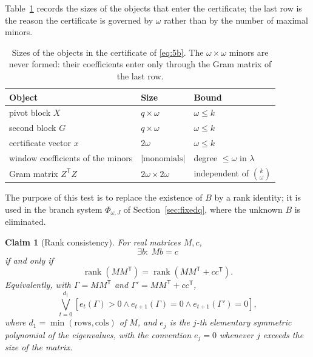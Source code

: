 \documentclass[journal]{IEEEtran}
\theoremstyle{plainn}
\newtheorem{claim}{Claim}
\theoremstyle{remark}
\begin{document}
Table~\ref{tab:certdim} records the sizes of the objects that enter the certificate; the last row is
the reason the certificate is governed by $\omega$ rather than by the number of maximal minors.

\begin{table}[!t]
\centering
\caption{Sizes of the objects in the certificate of \eqref{eq:5b}. The $\omega\times\omega$ minors are
never formed: their coefficients enter only through the Gram matrix of the last row.}
\label{tab:certdim}
\footnotesize
\begin{tabular}{@{}lll@{}}
\toprule
Object & Size & Bound \\
\midrule
pivot block $X$ & $q\times\omega$ & $\omega\le k$ \\
second block $G$ & $q\times\omega$ & $\omega\le k$ \\
certificate vector $x$ & $2\omega$ & $\omega\le k$ \\
window coefficients of the minors & $|\text{monomials}|$ & degree $\le\omega$ in $\lambda$ \\
Gram matrix $Z^{\mathsf T}Z$ & $2\omega\times2\omega$ & independent of $\binom{k}{\omega}$ \\
\bottomrule
\end{tabular}
\end{table}

The purpose of this test is to replace the existence of $B$ by a rank identity; it is used in the branch system $\Phi_{\omega,J}$ of Section~\ref{sec:fixedq}, where the unknown $B$ is eliminated.

\begin{claim}[Rank consistency]\label{lem:rankcons}
For real matrices $M,c$,
\begin{equation*}
\exists b:\ Mb=c
\end{equation*}
if and only if
\begin{equation}
\operatorname{rank}(MM^{\mathsf T})
=\operatorname{rank}(MM^{\mathsf T}+cc^{\mathsf T}).
\end{equation}
Equivalently, with $\Gamma=MM^{\mathsf T}$ and
$\Gamma'=MM^{\mathsf T}+cc^{\mathsf T}$,
\begin{equation}
\bigvee_{t=0}^{d_1}
\left[e_t(\Gamma)>0\wedge e_{t+1}(\Gamma)=0\wedge e_{t+1}(\Gamma')=0\right],
\end{equation}
where $d_1=\min(\text{rows},\text{cols})$ of $M$, and $e_j$ is the
$j$-th elementary symmetric polynomial of the eigenvalues, with the convention $e_j=0$ whenever $j$
exceeds the size of the matrix.
\end{claim}
\end{document}
